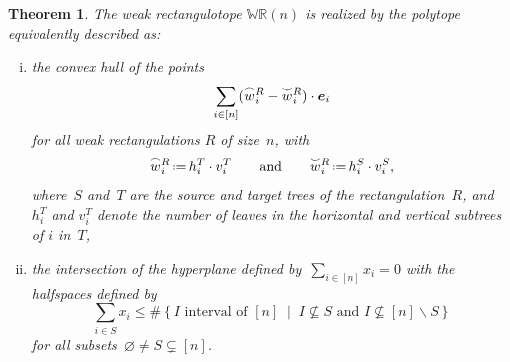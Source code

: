 \documentclass{amsart}
\newtheorem{theorem}{Theorem}%
\theoremstyle{definition}
\newcommand{\R}{\mathbb{R}} %
\renewcommand{\b}[1]{{\boldsymbol{#1}}} %
\newcommand{\set}[2]{\left\{ #1 \;\middle|\; #2 \right\}} %
\newcommand{\ssm}{\smallsetminus} %
\newcommand{\eqdef}{\mbox{\,\raisebox{0.2ex}{\scriptsize\ensuremath{\mathrm:}}\ensuremath{=}\,}} %
\newcommand{\polytope}[1]{\mathds{#1}} %
\newcommand{\WRP}{\polytope{WR}} %
\newcommand{\loday}[1]{\smash{\overset{\frown}{#1}}}
\newcommand{\antiloday}[1]{\smash{\overset{\smile}{#1}}}
\begin{document}
\begin{theorem}
  \label{thm:weakRectangulotope}
The weak rectangulotope $\WRP (n)$ is realized by the polytope equivalently described as:
  \begin{enumerate}[(i)]
  \item the convex hull of the points
    \[
    \sum_{i\in [n]} (\loday{w}^R_i - \antiloday{w}^R_i)\cdot \b{e}_i
    \]
    for all weak rectangulations $R$ of size~$n$, with
  \[
    \loday{w}^R_i \eqdef h^T_i\cdot v^T_i
    \qquad\text{and}\qquad
    \antiloday{w}^R_i \eqdef h^S_i\cdot v^S_i,
  \]
  where~$S$ and~$T$ are the source and target trees of the rectangulation~$R$, and $h^T_i$ and $v^T_i$ denote the number of leaves in the horizontal and vertical subtrees of $i$ in~$T$,
\item the intersection of the hyperplane defined by~$\sum_{i \in [n]} x_i = 0$ with the halfspaces defined by
  \[
  \sum_{i \in S} x_i \le \#\set{I \text{ interval of } [n]}{I \not\subseteq S \text{ and } I \not\subseteq [n] \ssm S}
  \]
  for all subsets~$\varnothing \ne S \subsetneq [n]$.
  \end{enumerate}
\end{theorem}
\end{document}
